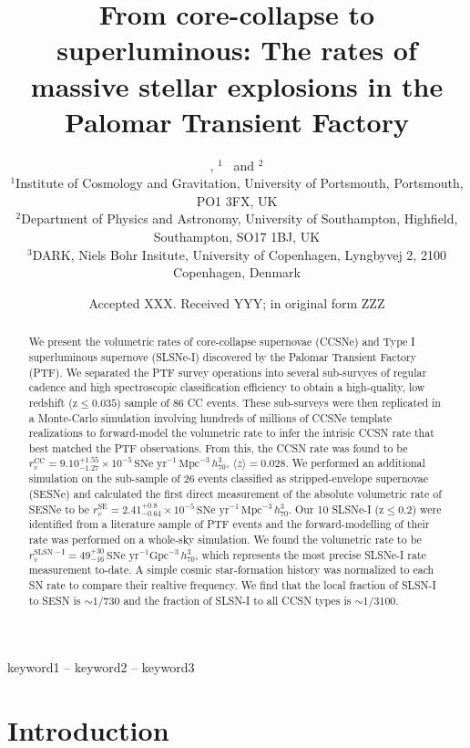 \documentclass[a4paper,fleqn,usenatbib]{mnras}
\title[The Rates of Core Collapse Events in PTF]{From core-collapse to superluminous: The rates of massive stellar explosions in the Palomar Transient Factory}
\author[C. Frohmaier et al.]{
\chris{C. Frohmaier,$^{1}$\thanks{E-mail: chris.frohmaier@port.ac.uk}}
\angus{C.~R.~Angus,$^{2,3}$}, \maria{M.  Vincenzi}$^{1}$~ and \marksul{M. Sullivan}$^{2}$
\\
$^{1}$Institute of Cosmology and Gravitation, University of Portsmouth, Portsmouth, PO1 3FX, UK\\
$^{2}$Department of Physics and Astronomy, University of Southampton, Highfield, Southampton, SO17 1BJ, UK\\
$^{3}$DARK, Niels Bohr Insitute, University of Copenhagen, Lyngbyvej 2, 2100 Copenhagen, Denmark
}
\date{Accepted XXX. Received YYY; in original form ZZZ}
\begin{document}
\label{firstpage}
\pagerange{\pageref{firstpage}--\pageref{lastpage}}
\maketitle

\begin{abstract}
    We present the volumetric rates of core-collapse supernovae (CCSNe) and Type I superluminous supernove (SLSNe-I) discovered by the Palomar Transient Factory (PTF). We separated the PTF survey operations into several sub-survyes of regular cadence and high spectroscopic classification efficiency to obtain a high-quality, low redshift (z${\le}0.035$) sample of 86 CC events. These sub-surveys were then replicated in a Monte-Carlo simulation involving hundreds of millions of CCSNe template realizations to forward-model the volumetric rate to infer the intrisic CCSN rate that best matched the PTF observations. From this, the CCSN rate was found to be $r^\mathrm{CC}_v=9.10_{-1.27}^{+1.55}\times10^{-5}\,\text{SNe yr}^{-1}\,\text{Mpc}^{-3}\, h_{70}^{3}$, $ \langle z \rangle = 0.028$. We performed an additional simulation on the sub-sample of 26 events classified as stripped-envelope supernovae (SESNe) and calculated the first direct measurement of the absolute volumetric rate of SESNe to be $r^\mathrm{SE}_v=2.41_{-0.64}^{+0.8}\times10^{-5}\, \text{SNe yr}^{-1}\,\text{Mpc}^{-3}\, h_{70}^{3}$. Our 10 SLSNe-I (z${\le}0.2$) were identified from a literature sample of PTF events and the forward-modelling of their rate was performed on a whole-sky simulation. We found the volumetric rate to be $r^\mathrm{SLSN-I}_v=49_{-16}^{+30}\, \text{SNe yr}^{-1}\text{Gpc}^{-3}\, h_{70}^{3}$, which represents the most precise SLSNe-I rate measurement to-date. A simple cosmic star-formation history was normalized to each SN rate to compare their realtive frequency. We find that the local fraction of SLSN-I to SESN is $\sim1/730$ and the fraction of SLSN-I to all CCSN types is $\sim 1/3100$.
\end{abstract}

\begin{keywords}
keyword1 -- keyword2 -- keyword3
\end{keywords}


\section{Introduction}
\end{document}
